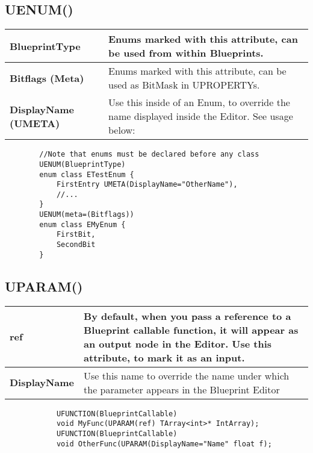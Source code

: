 \documentclass[10pt,a4paper]{article}
\begin{document}
\begin{multicols*}{2}
	
	\subsection{UENUM()}
	
	\begin{tabularx}{\columnwidth}{|l|X|}
		\hline \textbf{BlueprintType}
		& Enums marked with this attribute, can be used from within Blueprints. \\
		\hline \textbf{Bitflags (Meta)}
		& Enums marked with this attribute, can be used as BitMask in UPROPERTYs. \\
		\hline \textbf{DisplayName (UMETA)}
		& Use this inside of an Enum, to override the name displayed inside the Editor. See usage below: \\
		\hline
	\end{tabularx}
	
	\begin{minipage}{\columnwidth}
	\begin{verbatim}
		//Note that enums must be declared before any class
		UENUM(BlueprintType)
		enum class ETestEnum {
		    FirstEntry UMETA(DisplayName="OtherName"), 
		    //...
		}
		UENUM(meta=(Bitflags))
		enum class EMyEnum {
			FirstBit,
			SecondBit
		}
	\end{verbatim} 
	\end{minipage}

	\subsection{UPARAM()}
	\begin{tabularx}{\columnwidth}{|l|X|}
			\hline \textbf{ref}
			& By default, when you pass a reference to a Blueprint callable function, it will appear as an output node in the Editor. Use this attribute, to mark it as an input.\\
			\hline \textbf{DisplayName}
			& Use this name to override the name under which the parameter appears in the Blueprint Editor \\
			\hline
	\end{tabularx}
	
	\begin{minipage}{\columnwidth}
		\begin{verbatim}
			UFUNCTION(BlueprintCallable)
			void MyFunc(UPARAM(ref) TArray<int>* IntArray);
			UFUNCTION(BlueprintCallable)
			void OtherFunc(UPARAM(DisplayName="Name" float f);
		\end{verbatim}
	\end{minipage}
	

\end{multicols*}
\end{document}
